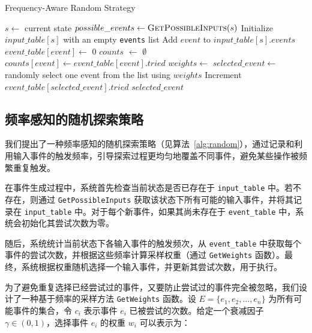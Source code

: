 \documentclass[twocolumn, 10pt]{article}
\begin{document}
\begin{algorithm}[t]
\caption{Frequency-Aware Random Strategy}
\label{alg:random}
\begin{algorithmic}[1]
\State $s \gets$ current state
    \State $possible\_events \gets \Call{GetPossibleInputs}{s}$
    \State Initialize $input\_table[s]$ with an empty \texttt{events} list
        \State Add $event$ to $input\_table[s].events$
            \State $event\_table[event] \gets$ 0
        \EndIf
    \EndFor
\EndIf
    \State $counts$ $\gets$ $\emptyset$
        \State $counts[event] \gets event\_table[event].tried$
    \EndFor
    \State $weights \gets$ 
    \State $selected\_event \gets$ randomly select one event from the list using $weights$
    \State Increment $event\_table[selected\_event].tried$
    \State \Return $selected\_event$
\EndFunction
\end{algorithmic}
\end{algorithm}

\subsection{频率感知的随机探索策略}
\label{sec:frequency}

我们提出了一种频率感知的随机探索策略（见算法~\ref{alg:random}），通过记录和利用输入事件的触发频率，引导探索过程更均匀地覆盖不同事件，避免某些操作被频繁重复触发。

在事件生成过程中，系统首先检查当前状态是否已存在于 \texttt{input\_table} 中。若不存在，则通过 \texttt{GetPossibleInputs} 获取该状态下所有可能的输入事件，并将其记录在 \texttt{input\_table} 中。对于每个新事件，如果其尚未存在于 \texttt{event\_table} 中，系统会初始化其尝试次数为零。

随后，系统统计当前状态下各输入事件的触发频次，从 \texttt{event\_table} 中获取每个事件的尝试次数，并根据这些频率计算采样权重（通过 \texttt{GetWeights} 函数）。最终，系统根据权重随机选择一个输入事件，并更新其尝试次数，用于执行。

为了避免重复选择已经尝试过的事件，又要防止尝试过的事件完全被忽略，我们设计了一种基于频率的采样方法 \texttt{GetWeights} 函数。设 $E = \{e_1, e_2, \dots, e_n\}$ 为所有可能事件的集合，令 $c_i$ 表示事件 $e_i$ 已被尝试的次数。给定一个衰减因子 $\gamma \in (0, 1)$，选择事件 $e_i$ 的权重 $w_i$ 可以表示为：
\end{document}
